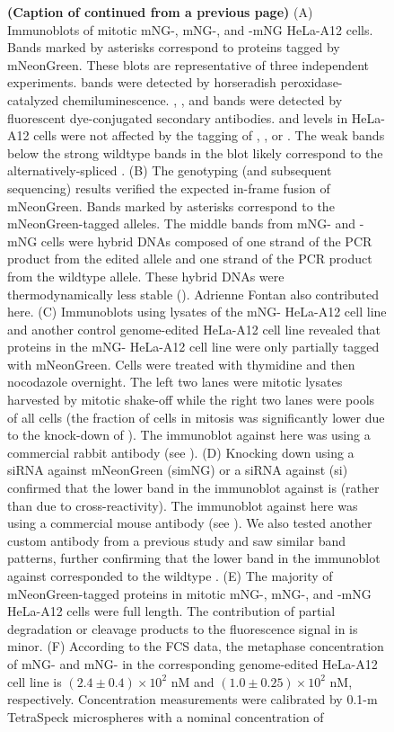 \begin{figure} [t!]
    \noindent\justifying \textbf{(Caption of  continued from a previous page)} (A) Immunoblots of mitotic mNG-, mNG-, and -mNG HeLa-A12 cells. Bands marked by asterisks correspond to proteins tagged by mNeonGreen. These blots are representative of three independent experiments.  bands were detected by horseradish peroxidase-catalyzed chemiluminescence. , , and  bands were detected by fluorescent dye-conjugated secondary antibodies.  and  levels in HeLa-A12 cells were not affected by the  tagging of , , or . The weak bands below the strong wildtype bands in the  blot likely correspond to the alternatively-spliced  \cite{Mad1beta}. (B) The genotyping (and subsequent sequencing) results verified the expected in-frame fusion of mNeonGreen. Bands marked by asterisks correspond to the mNeonGreen-tagged alleles. The middle bands from mNG- and -mNG cells were hybrid DNAs composed of one strand of the PCR product from the edited allele and one strand of the PCR product from the wildtype allele. These hybrid DNAs were thermodynamically less stable (). Adrienne Fontan also contributed here. (C) Immunoblots using lysates of the mNG- HeLa-A12 cell line and another control genome-edited HeLa-A12 cell line revealed that  proteins in the mNG- HeLa-A12 cell line were only partially tagged with mNeonGreen. Cells were treated with thymidine and then nocodazole overnight. The left two lanes were mitotic lysates harvested by mitotic shake-off while the right two lanes were pools of all cells (the fraction of cells in mitosis was significantly lower due to the knock-down of ). The immunoblot against  here was using a commercial rabbit antibody (see ). (D) Knocking down  using a siRNA against mNeonGreen (simNG) or a siRNA against  (si) confirmed that the lower band in the immunoblot against  is  (rather than due to cross-reactivity). The immunoblot against  here was using a commercial mouse antibody (see ). We also tested another custom antibody from a previous study \cite{SheepAntiBUB1} and saw similar band patterns, further confirming that the lower band in the immunoblot against  corresponded to the wildtype . (E) The majority of mNeonGreen-tagged proteins in mitotic mNG-, mNG-, and -mNG HeLa-A12 cells were full length. The contribution of partial degradation or cleavage products to the fluorescence signal in  is minor. (F) According to the FCS data, the metaphase concentration of mNG- and mNG- in the corresponding genome-edited HeLa-A12 cell line is $(2.4 \pm 0.4) \times 10^2$ nM and $(1.0 \pm 0.25) \times 10^2$ nM, respectively. Concentration measurements were calibrated by 0.1-\textmu{}m TetraSpeck\texttrademark{} microspheres with a nominal concentration of 
\end{figure}
